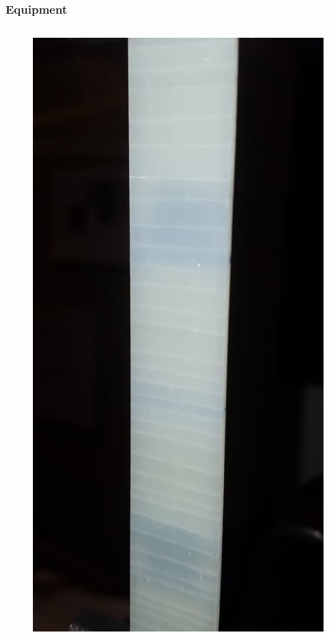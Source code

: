 \documentclass[first,firstsupp,lastsupp,last,hyperref,table]{ETHclass}
\begin{document}
\begin{frame}
\frametitle{\vspace{0.3cm}\small Equipment}
\vspace{-0.75cm}
\centering
\begin{columns}[c]
\begin{column}{0.5\textwidth}
\begin{figure}
\centering
\includegraphics[height=0.8\textheight]{0-90_2_symm}

\end{figure}
\end{column}
\end{columns}
\end{frame}
\end{document}
